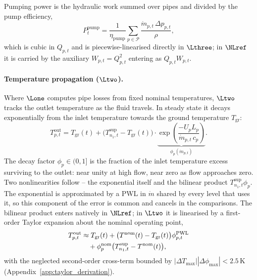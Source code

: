Pumping power is the hydraulic work summed over pipes and divided by the pump efficiency,
%
\begin{equation}
  P_t^{\mathrm{pump}} = \frac{1}{\eta_{\mathrm{pump}}}
    \sum_{p \in \mathcal{P}}
    \frac{\dot{m}_{p,t}\, \Delta p_{p,t}}{\rho},
  \label{eq:pump_power}
\end{equation}
%
which is cubic in $Q_{p,t}$ and is piecewise-linearised directly in $\Lthree$; in $\NLref$
it is carried by the auxiliary $W_{p,t} = Q_{p,t}^2$ entering as $Q_{p,t} W_{p,t}$.

\paragraph{Temperature propagation ($\Ltwo$).}
Where $\Lone$ computes pipe losses from fixed nominal temperatures, $\Ltwo$ tracks the
outlet temperature as the fluid travels. In steady state it decays exponentially from the
inlet temperature towards the ground temperature $T_{\mathrm{gr}}$:
%
\begin{equation}
  T_{p,t}^{\mathrm{out}} = T_{\mathrm{gr}}(t)
    + \bigl(T_{n_1,t}^{\mathrm{sup}} - T_{\mathrm{gr}}(t)\bigr)
    \cdot \underbrace{\exp\!\left(
      \frac{-U_p L_p}{\dot{m}_{p,t}\, c_p}
    \right)}_{\displaystyle\phi_p(\dot{m}_{p,t})}.
  \label{eq:temp_prop}
\end{equation}
%
The decay factor $\phi_p \in (0,1]$ is the fraction of the inlet temperature excess
surviving to the outlet: near unity at high flow, near zero as flow approaches zero. Two
nonlinearities follow -- the exponential itself and the bilinear product
$T_{n_1,t}^{\mathrm{sup}} \phi_p$. The exponential is approximated by a PWL in $\dot{m}$
shared by every level that uses it, so this component of the error is common and cancels in
the comparisons. The bilinear product enters natively in $\NLref$; in $\Ltwo$ it is
linearised by a first-order Taylor expansion about the nominal operating point,
%
\begin{align}
  T_{p,t}^{\mathrm{out}} &\approx T_{\mathrm{gr}}(t)
    + \bigl(T^{\mathrm{nom}}(t) - T_{\mathrm{gr}}(t)\bigr)
      \phi_{p,t}^{\mathrm{PWL}} \notag \\
    &\quad + \phi_p^{\mathrm{nom}}
      \bigl(T_{n_1,t}^{\mathrm{sup}} - T^{\mathrm{nom}}(t)\bigr),
  \label{eq:temp_prop_lin}
\end{align}
%
with the neglected second-order cross-term bounded by
$|\Delta T_{\max}||\Delta\phi_{\max}| < 2.5$\,K (Appendix~\ref{app:taylor_derivation}).

